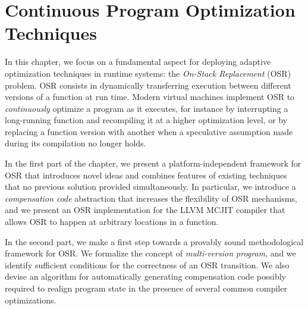 \chapter{Continuous Program Optimization Techniques}
\label{ch:continuous}

In this chapter, we focus on a fundamental aspect for deploying adaptive optimization techniques in runtime systems: the {\em On-Stack Replacement} (OSR) problem. OSR consists in dynamically transferring execution between different versions of a function at run time. Modern virtual machines implement OSR to {\em continuously} optimize a program as it executes, for instance by interrupting a long-running function and recompiling it at a higher optimization level, or by replacing a function version with another when a speculative assumption made during its compilation no longer holds.

In the first part of the chapter, we present a platform-independent framework for OSR that introduces novel ideas and combines features of existing techniques that no previous solution provided simultaneously. In particular, we introduce a {\em compensation code} abstraction that increases the flexibility of OSR mechanisms, and we present an OSR implementation for the LLVM MCJIT compiler that allows OSR to happen at arbitrary locations in a function.

In the second part, we make a first step towards a provably sound methodological framework for OSR. We formalize the concept of {\em multi-version program}, and we identify sufficient conditions for the correctness of an OSR transition. We also devise an algorithm for automatically generating compensation code possibly required to realign program state in the presence of several common compiler optimizations.


